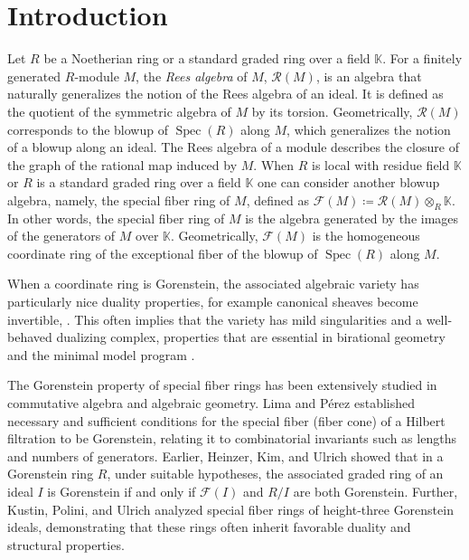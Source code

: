 \documentclass[11pt,a4paper,reqno,dvipsnames]{amsart}
\theoremstyle{plain}
\theoremstyle{definition}
\newtheorem{Assumptions and Discussion}[Theorem]{Assumptions and Discussion}
\theoremstyle{remark}
\def\KK{{\mathbb K}}
\newcommand\calF{\mathcal{F}}
\newcommand\calR{\mathcal{R}}
\newcommand\Spec{\operatorname{Spec}}
\begin{document}
\section{Introduction}
Let $R$ be a Noetherian  ring or a standard graded ring  over a field $\KK$. For  a finitely  generated $R$-module $M$, the \emph{Rees algebra} of $M$, $\calR(M)$, is an algebra that naturally generalizes the notion of the Rees algebra of an ideal. It is defined as the quotient of the symmetric algebra of $M$ by its torsion.  Geometrically, $\calR(M)$ corresponds to the blowup of $\Spec(R)$ along $M$, which generalizes the notion of a blowup along an ideal. The Rees algebra of a module describes the closure of the graph of the rational map induced by $M$.
When $R$ is local with residue field $\KK$ or $R$ is a standard graded ring over a field $\KK$ one can consider another blowup algebra, namely, the special fiber ring of $M$, defined as $\calF(M)\coloneq \calR(M)\otimes_{R}\KK$. In other words, the special fiber ring of $M$ is the algebra generated by the images of the generators of $M$ over $\KK$. Geometrically,  $\calF(M)$
is the homogeneous coordinate ring of the exceptional fiber of the blowup of $\Spec(R)$ along $M$.

When a coordinate ring is Gorenstein, the associated algebraic variety has particularly nice duality properties, for example canonical sheaves become invertible, \cite[Chapter~3]{BHCMbook}.   This often implies that the variety has mild singularities and a well-behaved dualizing complex, properties that  are essential in birational geometry and the minimal model program \cite[Chapter~21]{EiComm}. 

The Gorenstein property of special fiber rings has been extensively studied in commutative algebra and algebraic geometry.  
Lima and Pérez \cite{LimaPerez2012} established necessary and sufficient conditions for the special fiber (fiber cone) of a Hilbert filtration to be Gorenstein, relating it to combinatorial invariants such as lengths and numbers of generators.  
Earlier, Heinzer, Kim, and Ulrich \cite{HeinzerKimUlrich2004} showed that in a Gorenstein ring $R$, under suitable hypotheses,  the associated graded ring of an ideal $I$  is Gorenstein if and only if $\calF(I)$ and $R/I$ are both Gorenstein.
Further, Kustin, Polini, and Ulrich \cite{KustinPoliniUlrich2015} analyzed special fiber rings of height-three Gorenstein ideals, demonstrating that these rings often inherit favorable duality and structural properties. 
\end{document}
